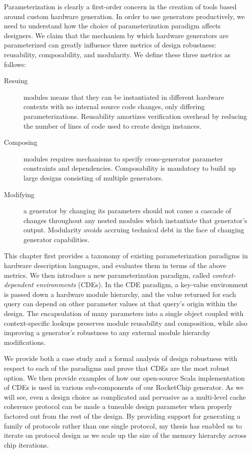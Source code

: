 Parameterization is clearly a first-order concern in the creation of tools based around custom hardware generation.
In order to use generators productively, we need to understand how the choice of parameterization paradigm affects designers.
We claim that the mechanism by which hardware generators are parameterized can greatly influence three metrics of design robustness: reusability, composability, and modularity.
We define these three metrics as follows:
\begin{description}
\item[Resuing] modules means that they can be instantiated in different hardware contexts with no internal source code changes, only differing parameterizations. Reusability amortizes verification overhead by reducing the number of lines of code used to create design instances.
\item[Composing] modules requires mechanisms to specify cross-generator parameter constraints and dependencies. Composability is mandatory to build up large designs consisting of multiple generators.
\item[Modifying] a generator by changing its parameters should not cause a cascade of changes throughout any nested modules which instantiate that generator's output. Modularity avoids accruing technical debt in the face of changing generator capabilities.
\end{description}

This chapter first provides a taxonomy of existing parameterization paradigms in hardware description languages,
and evaluates them in terms of the above metrics.
We then introduce a new parameterization paradigm, called \emph{context-dependent environments} (CDEs).
In the CDE paradigm, a key-value environment is passed down a hardware module hierarchy, and the value returned for each query can depend on other parameter values at that query's origin within the design.
The encapsulation of many parameters into a single object coupled with context-specific lookups preserves module reusability and composition, while also improving a generator's robustness to any external module hierarchy modifications.

We provide both a case study and a formal analysis of design robustness with respect to each of the paradigms and prove that CDEs are the most robust option.
We then provide examples of how our open-source Scala implementation of CDEs is used in various sub-components of our RocketChip generator.
As we will see, even a design choice as complicated and pervasive as a multi-level cache coherence protocol can be made a tuneable design parameter when properly factored out from the rest of the design. 
By providing support for generating a family of protocols rather than one single protocol, my thesis has enabled us to iterate on protocol design as we scale up the size of the memory hierarchy across chip iterations.

